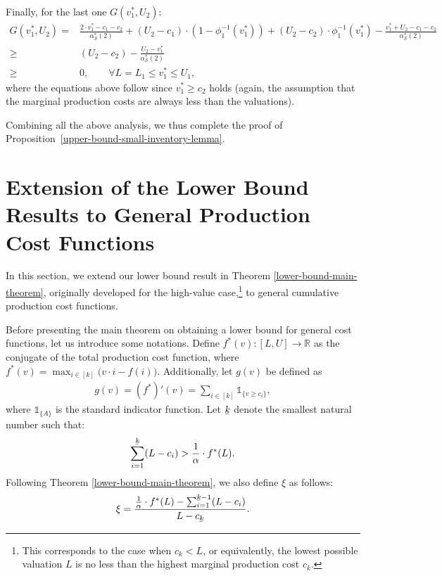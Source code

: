          Finally, for the last one $ G(v^{*}_{1},U_{2}) $:
             \begin{align*}
            G(v^{*}_{1},U_{2})
            = & \frac{2\cdot v^{*}_{1} - c_1-c_2}{\alpha_{\mathcal{S}}^*(2)} + (U_{2}-c_1) \cdot (1-\phi_{1}^{-1}(v^{*}_{1}))  +  (U_2-c_2) \cdot \phi_{1}^{-1}(v^{*}_{1}) - \frac{v^{*}_{1}+U_{2}-c_1-c_2}{\alpha_{\mathcal{S}}^*(2)} \\
            \ge & (U_{2}-c_2) - \frac{U_{2} - v^{*}_{1}}{\alpha_{\mathcal{S}}^*(2)} \\
            \ge & 0, \qquad  \forall  L = L_1 \leq v^{*}_{1} \leq U_1,
        \end{align*}
        where the equations above follow since $v^{*}_{1} \ge c_{2}$ holds (again, the assumption that the marginal production costs are always less than the valuations).

Combining all the above analysis, we thus complete the proof of Proposition~\ref{upper-bound-small-inventory-lemma}.


\section{Extension of the Lower Bound Results to General Production Cost Functions}
\label{appendix-lower-bound-extension-general-cost-function}
In this section, we extend our lower bound result in Theorem \ref{lower-bound-main-theorem}, originally developed for the high-value case,\footnote{This corresponds to the case when $c_k < L$, or equivalently, the lowest possible valuation $ L $ is no less than the highest marginal production cost $ c_k $.} to general cumulative production cost functions.

Before presenting the main theorem on obtaining a lower bound for general cost functions, let us introduce some notations. Define
$f^{*}(v):[L,U]\rightarrow \mathbb{R}$ as the conjugate of the total production cost function, where $f^{*}(v) = \max_{i \in [k]} \big(v \cdot i -f(i)\big)$. Additionally, let $ g(v) $ be defined as
\begin{align*}
    g(v) = (f^{*})'(v) = \sum_{i \in [k]} \mathds{1}_{\{v \ge c_{i}\}},
\end{align*}
where $\mathds{1}_{\{A\}}$ is the standard indicator function. Let $\ubar{k}$ denote the smallest natural number such that:
\begin{align*}
    \sum_{i=1}^{\ubar{k}} (L-c_{i}) > \frac{1}{\alpha} \cdot f^{*}(L).
\end{align*}
Following Theorem \ref{lower-bound-main-theorem}, we also define $ \xi $ as follows:
\begin{align*}
    \xi = \frac{\frac{1}{\alpha}\cdot f^{*}(L)-\sum_{i=1}^{\ubar{k}-1} (L-c_{i})}{L - c_{\ubar{k}}}.
\end{align*}


